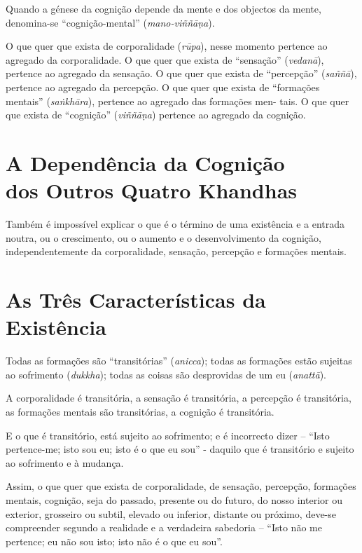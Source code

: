 Quando a génese da cognição depende da mente e dos objectos da mente,
denomina-se ``cognição-mental'' (\emph{mano-viññāṇa}).


O que quer que exista de corporalidade (\emph{rūpa}), nesse momento pertence ao
agregado da corporalidade. O que quer que exista de ``sensação''
(\emph{vedanā}), pertence ao agregado da sensação. O que quer que exista de
``percepção'' (\emph{saññā}), pertence ao agregado da percepção. O que quer que
exista de ``formações mentais'' (\emph{saṅkhāra}), pertence ao agregado das
formações men- tais. O que quer que exista de ``cognição'' (\emph{viññāṇa})
pertence ao agregado da cognição.


\section{A Dependência da Cognição\\ dos Outros Quatro Khandhas}

Também é impossível explicar o que é o término de uma existência e a entrada
noutra, ou o crescimento, ou o aumento e o desenvolvimento da cognição,
independentemente da corporalidade, sensação, percepção e formações mentais.


\clearpage

\section{As Três Características da Existência}


Todas as formações são ``transitórias'' (\emph{anicca}); todas as formações
estão sujeitas ao sofrimento (\emph{dukkha}); todas as coisas são desprovidas de
um eu (\emph{anattā}).


A corporalidade é transitória, a sensação é transitória, a percepção é
transitória, as formações mentais são transitórias, a cognição é transitória.

E o que é transitório, está sujeito ao sofrimento; e é incorrecto dizer --
``Isto pertence-me; isto sou eu; isto é o que eu sou'' - daquilo que é
transitório e sujeito ao sofrimento e à mudança.

Assim, o que quer que exista de corporalidade, de sensação, percepção, formações
mentais, cognição, seja do passado, presente ou do futuro, do nosso interior ou
exterior, grosseiro ou subtil, elevado ou inferior, distante ou próximo, deve-se
compreender segundo a realidade e a verdadeira sabedoria -- ``Isto não me
pertence; eu não sou isto; isto não é o que eu sou''.

